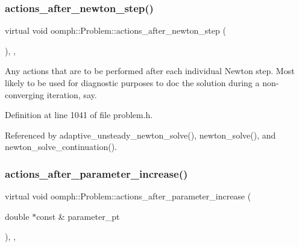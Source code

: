 \mbox{\label{classoomph_1_1Problem_aed8bc6e7b0bb45b86d5b44737b554d50}} 
\subsubsection{\texorpdfstring{actions\+\_\+after\+\_\+newton\+\_\+step()}{actions\_after\_newton\_step()}}
{\footnotesize\ttfamily virtual void oomph\+::\+Problem\+::actions\+\_\+after\+\_\+newton\+\_\+step (\begin{DoxyParamCaption}{ }\end{DoxyParamCaption})\hspace{0.3cm}{\ttfamily [inline]}, {\ttfamily [protected]}, {\ttfamily [virtual]}}



Any actions that are to be performed after each individual Newton step. Most likely to be used for diagnostic purposes to doc the solution during a non-\/converging iteration, say. 



Definition at line 1041 of file problem.\+h.



Referenced by adaptive\+\_\+unsteady\+\_\+newton\+\_\+solve(), newton\+\_\+solve(), and newton\+\_\+solve\+\_\+continuation().

\mbox{\label{classoomph_1_1Problem_a54e18ddf6073f9debd478f6b21a717de}} 
\subsubsection{\texorpdfstring{actions\+\_\+after\+\_\+parameter\+\_\+increase()}{actions\_after\_parameter\_increase()}}
{\footnotesize\ttfamily virtual void oomph\+::\+Problem\+::actions\+\_\+after\+\_\+parameter\+\_\+increase (\begin{DoxyParamCaption}\item[{double $\ast$const \&}]{parameter\+\_\+pt }\end{DoxyParamCaption})\hspace{0.3cm}{\ttfamily [inline]}, {\ttfamily [protected]}, {\ttfamily [virtual]}}



